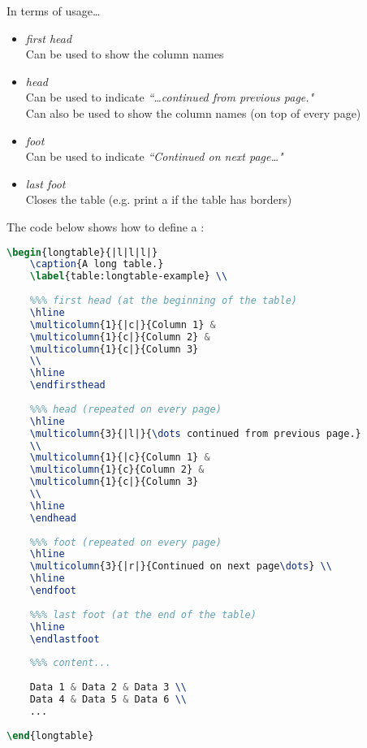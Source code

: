 In terms of usage\dots
\begin{itemize}	
	\item \emph{first head} \\
	Can be used to show the column names
	
	\item \emph{head} \\
	Can be used to indicate \emph{``\dots continued from previous page."} \\
	Can also be used to show the column names (on top of every page)

	\item \emph{foot} \\
	Can be used to indicate \emph{``Continued on next page\dots"}

	\item \emph{last foot} \\
	Closes the table (e.g. print a  if the table has borders) \\
\end{itemize}



The code below shows how to define a :
\begin{lstlisting}[language=tex]
\begin{longtable}{|l|l|l|}
	\caption{A long table.} 
	\label{table:longtable-example} \\
	
	%%% first head (at the beginning of the table)
	\hline
	\multicolumn{1}{|c|}{Column 1} &
	\multicolumn{1}{c|}{Column 2} &
	\multicolumn{1}{c|}{Column 3}
	\\
	\hline
	\endfirsthead
	
	%%% head (repeated on every page)
	\hline
	\multicolumn{3}{|l|}{\dots continued from previous page.} 
	\\
	\multicolumn{1}{|c}{Column 1} &
	\multicolumn{1}{c}{Column 2} &
	\multicolumn{1}{c|}{Column 3}
	\\
	\hline
	\endhead
	
	%%% foot (repeated on every page)
	\hline
	\multicolumn{3}{|r|}{Continued on next page\dots} \\
	\hline
	\endfoot
	
	%%% last foot (at the end of the table)
	\hline
	\endlastfoot
	
	%%% content...
	
	Data 1 & Data 2 & Data 3 \\
	Data 4 & Data 5 & Data 6 \\
	...
	
\end{longtable}

\end{lstlisting}





